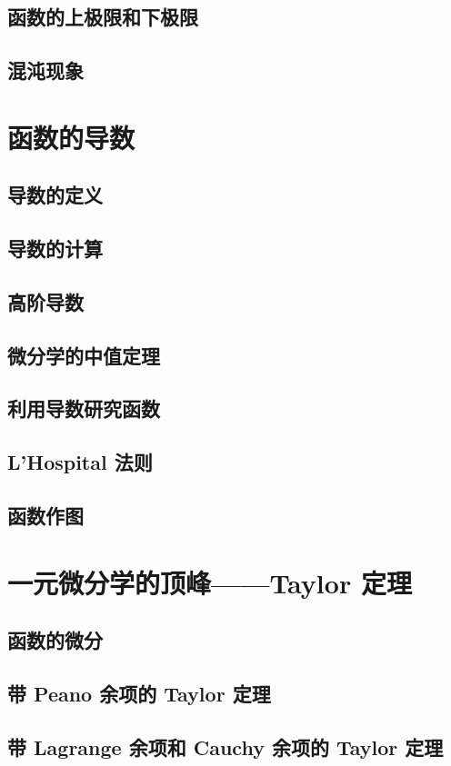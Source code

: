 \documentclass[a4paper, 12pt]{ctexbook}
\begin{document}
        \section{函数的上极限和下极限}
        \section{混沌现象}
    \chapter{函数的导数}
        \section{导数的定义}
        \section{导数的计算}
        \section{高阶导数}
        \section{微分学的中值定理}
        \section{利用导数研究函数}
        \section{L'Hospital 法则}
        \section{函数作图}
    \chapter{一元微分学的顶峰——Taylor 定理}
        \section{函数的微分}
        \section{带 Peano 余项的 Taylor 定理}
        \section{带 Lagrange 余项和 Cauchy 余项的 Taylor 定理}
\end{document}

